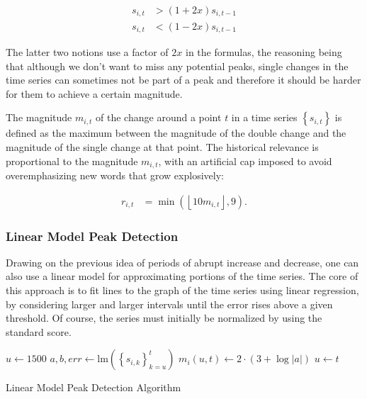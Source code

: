 \begin{align}
\label{eq:single-increase}
s_{i, t} &> \left( 1 + 2x \right) s_{i, t - 1}
\\
\label{eq:single-decrease}
s_{i, t} &< \left( 1 - 2x \right) s_{i, t - 1}
\end{align}

The latter two notions use a factor of $2x$ in the formulas, the reasoning being that although we don't want to miss any potential peaks, single changes in the time series can sometimes not be part of a peak and therefore it should be harder for them to achieve a certain magnitude.

The magnitude $m_{i, t}$ of the change around a point $t$ in a time series $\left\{ s_{i, t} \right\}$ is defined as the maximum between the magnitude of the double change and the magnitude of the single change at that point. The historical relevance is proportional to the magnitude $m_{i, t}$, with an artificial cap imposed to avoid overemphasizing new words that grow explosively:

\begin{align}
\label{eq:double-change-relevance}
r_{i, t} &= \min \left( \left\lfloor 10 m_{i, t} \right\rfloor, 9 \right).
\end{align}

\subsubsection{Linear Model Peak Detection}

Drawing on the previous idea of periods of abrupt increase and decrease, one can also use a linear model for approximating portions of the time series. The core of this approach is to fit lines to the graph of the time series using linear regression, by considering larger and larger intervals until the error rises above a given threshold. Of course, the series must initially be normalized by using the standard score.

\begin{algorithm}

\begin{algorithmic}[1]
    \State $u \gets 1500$
        \State $a, b, err \gets \textrm{lm} \left( \left\{ s_{i, k} \right\}_{k = u}^t \right)$
            \State $m_i \left( u, t \right) \gets 2 \cdot \left( 3 + \log \left| a \right| \right)$
            \State $u \gets t$
        \EndIf
    \EndFor
\EndFor
\end{algorithmic}

\caption{Linear Model Peak Detection Algorithm}
\label{alg:linear-model}

\end{algorithm}

